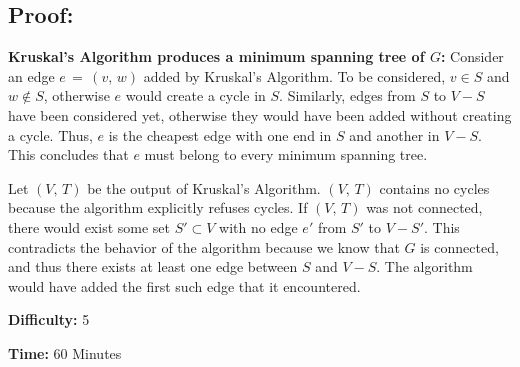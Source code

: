 \documentclass{article}
\begin{document}
\subsection*{Proof:}
\textbf{Kruskal's Algorithm produces a minimum spanning tree of $G$:}
Consider an edge $e \, = \, (v, \, w)$ added by Kruskal's Algorithm.  To be considered, $v \in S$ and $w \notin S$, otherwise $e$ would create a cycle in $S$.
Similarly, edges from $S$ to $V-S$ have been considered yet, otherwise they would have been added without creating a cycle.  Thus, $e$ is the cheapest edge with one end in $S$ and another in $V-S$.  This concludes that $e$ must belong to every minimum spanning tree. \cite{algDesign}

\noindent Let $(V, \, T)$ be the output of Kruskal's Algorithm.  $(V, \, T)$ contains no cycles because the algorithm explicitly refuses cycles.  If $(V, \, T)$ was not connected, there would exist some set $S' \subset V$ with no edge $e'$ from $S'$ to $V- S'$.  This contradicts the behavior of the algorithm because we know that $G$ is connected, and thus there exists at least one edge between $S$ and $V-S$.  The algorithm would have added the first such edge that it encountered. \cite{algDesign} \newline

\noindent \textbf{Difficulty:}  5

\noindent \textbf{Time:}  60 Minutes



\end{document}
